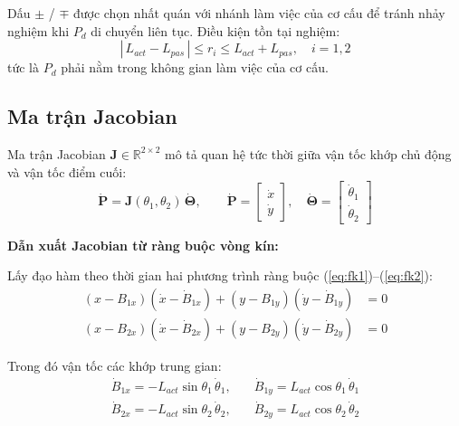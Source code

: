Dấu $\pm$ / $\mp$ được chọn nhất quán với nhánh làm việc của cơ cấu để tránh
nhảy nghiệm khi $P_d$ di chuyển liên tục. Điều kiện tồn tại nghiệm:
\begin{equation}
    \left|\,L_{act} - L_{pas}\,\right| \leq r_i \leq L_{act} + L_{pas},
    \quad i = 1, 2
    \label{eq:ik_exist}
\end{equation}
tức là $P_d$ phải nằm trong không gian làm việc của cơ cấu.


\subsection{Ma trận Jacobian}

Ma trận Jacobian $\mathbf{J} \in \mathbb{R}^{2\times2}$ mô tả quan hệ tức thời
giữa vận tốc khớp chủ động và vận tốc điểm cuối:
\begin{equation}
    \dot{\mathbf{P}} = \mathbf{J}(\theta_1,\theta_2)\,\dot{\boldsymbol{\Theta}},
    \qquad
    \dot{\mathbf{P}} = \begin{bmatrix}\dot{x}\\\dot{y}\end{bmatrix}, \quad
    \dot{\boldsymbol{\Theta}} = \begin{bmatrix}\dot{\theta}_1\\\dot{\theta}_2\end{bmatrix}
    \label{eq:jacobian_def}
\end{equation}

\textbf{Dẫn xuất Jacobian từ ràng buộc vòng kín:}

Lấy đạo hàm theo thời gian hai phương trình ràng buộc
(\ref{eq:fk1})--(\ref{eq:fk2}):
\begin{align}
    (x - B_{1x})(\dot{x} - \dot{B}_{1x}) + (y - B_{1y})(\dot{y} - \dot{B}_{1y}) &= 0\\
    (x - B_{2x})(\dot{x} - \dot{B}_{2x}) + (y - B_{2y})(\dot{y} - \dot{B}_{2y}) &= 0
\end{align}

Trong đó vận tốc các khớp trung gian:
\begin{align}
    \dot{B}_{1x} = -L_{act}\sin\theta_1\,\dot{\theta}_1, &\quad
    \dot{B}_{1y} =  L_{act}\cos\theta_1\,\dot{\theta}_1 \\
    \dot{B}_{2x} = -L_{act}\sin\theta_2\,\dot{\theta}_2, &\quad
    \dot{B}_{2y} =  L_{act}\cos\theta_2\,\dot{\theta}_2
\end{align}

